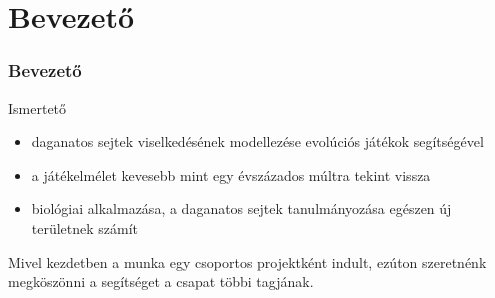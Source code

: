 \section{Bevezető}

\begin{frame}
	\frametitle{Bevezető}
	\begin{block}{Ismertető}
		\begin{itemize}
			\item daganatos sejtek viselkedésének modellezése evolúciós játékok segítségével
			\item a játékelmélet kevesebb mint egy évszázados múltra tekint vissza
			\item biológiai alkalmazása, a daganatos sejtek tanulmányozása egészen új területnek számít
		\end{itemize}
	\end{block}
	
	\begin{block}{}
		Mivel kezdetben a munka egy csoportos projektként indult, ezúton szeretnénk megköszönni a segítséget a csapat többi tagjának.
	\end{block}
\end{frame}